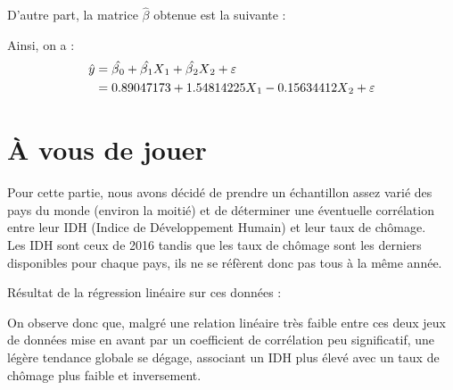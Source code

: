 \documentclass[paper=a4, fontsize=11pt]{scrartcl} %
\numberwithin{equation}{section} %
\numberwithin{figure}{section} %
\numberwithin{table}{section} %
\begin{document}
D'autre part, la matrice $\hat{\beta}$ obtenue est la suivante :
\begin{center}
\end{center}
Ainsi, on a :
\begin{align} 
	\begin{split}
	\hat{y} &= \hat{\beta\textsubscript{0}} + \hat{\beta\textsubscript{1}}X\textsubscript{1} + \hat{\beta\textsubscript{2}}X\textsubscript{2} + \varepsilon \\
	&= 0.89047173 + 1.54814225X\textsubscript{1} - 0.15634412X\textsubscript{2} + \varepsilon \\
	\end{split}					
	\end{align}

\newpage
\section{À vous de jouer}
Pour cette partie, nous avons décidé de prendre un échantillon assez varié des pays du monde (environ la moitié) et de déterminer une éventuelle corrélation entre leur IDH (Indice de Développement Humain) et leur taux de chômage.\\
Les IDH sont ceux de 2016 tandis que les taux de chômage sont les derniers disponibles pour chaque pays, ils ne se réfèrent donc pas tous à la même année.

\newpage
Résultat de la régression linéaire sur ces données :\\
\begin{center}
\end{center}
\begin{center}
\end{center}

On observe donc que, malgré une relation linéaire très faible entre ces deux jeux de données mise en avant par un coefficient de corrélation peu significatif, une légère tendance globale se dégage, associant un IDH plus élevé avec un taux de chômage plus faible et inversement.
\end{document}
